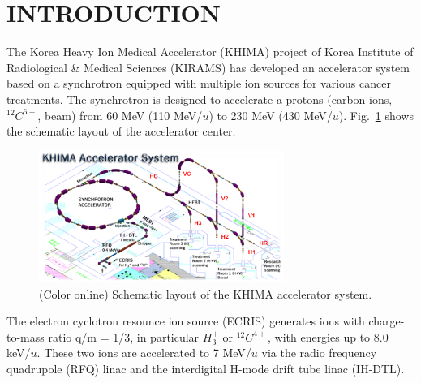 \documentclass[jkps,preprint,fleqn,showpacs,showkeys]{revtex4}
\begin{document}

\maketitle


\section{INTRODUCTION}
The Korea Heavy Ion Medical Accelerator (KHIMA) project of Korea Institute of Radiological \& Medical Sciences (KIRAMS) 
has developed an accelerator system based on a synchrotron equipped with multiple ion sources for various cancer treatments.
The synchrotron is designed to accelerate a protons (carbon ions, $^{12}C^{6+}$, beam) 
from 60 MeV (110 MeV/$u$) to 230 MeV (430 MeV/$u$). %
Fig.~\ref{fig0} shows the schematic layout of the accelerator center. 
\begin{figure}[h]
  \begin{center}
    \includegraphics[width=8.0cm]{Fig01.png}
    \caption{(Color online) Schematic layout of the KHIMA accelerator system.}
    \label{fig0}
  \end{center}
\end{figure}
The electron cyclotron resounce ion source (ECRIS) generates ions with charge-to-mass ratio q/m = 1/3, in particular $H^{+}_{3}$ or $^{12}C^{4+}$, 
with energies up to 8.0 keV/$u$. 
These two ions are accelerated to 7 MeV/$u$ via the radio frequency quadrupole (RFQ) linac and the interdigital H-mode drift tube linac (IH-DTL). 
\end{document}
